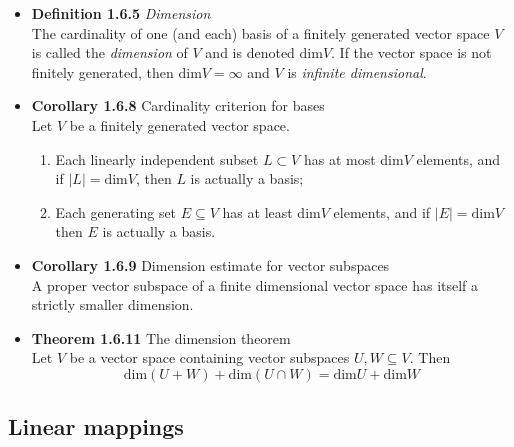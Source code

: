 \documentclass[11pt,a4paper]{article}
\begin{document}
\begin{itemize}
    \item \textbf{Definition 1.6.5} \emph{Dimension} \\
        The cardinality of one (and each) basis of a finitely generated vector space $V$
        is called the \emph{dimension} of $V$ and is denoted $\text{dim}V$.
        If the vector space is not finitely generated, then $\text{dim}V = \infty$
        and $V$ is \emph{infinite dimensional}.

    \item \textbf{Corollary 1.6.8} Cardinality criterion for bases \\
        Let $V$ be a finitely generated vector space.
        \begin{enumerate}
            \item Each linearly independent subset $L \subset V$ has at most dim$V$ elements,
                and if $|L| = \text{dim}V$, then $L$ is actually a basis;
            \item Each generating set $E \subseteq V$ has at least dim$V$ elements,
                and if $|E| = \text{dim}V$ then $E$ is actually a basis.
        \end{enumerate}

    \item \textbf{Corollary 1.6.9} Dimension estimate for vector subspaces \\
        A proper vector subspace of a finite dimensional vector space has itself a strictly
        smaller dimension.

    \item \textbf{Theorem 1.6.11} The dimension theorem \\
        Let $V$ be a vector space containing vector subspaces $U, W \subseteq V$.  Then
        \[
            \text{dim}(U+W) + \text{dim}(U \cap W) = \text{dim}U + \text{dim}W
        \]
\end{itemize}

\subsection{Linear mappings}
\end{document}
